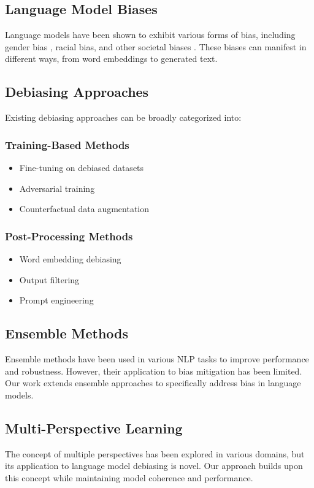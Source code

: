 \subsection{Language Model Biases}
Language models have been shown to exhibit various forms of bias, including gender bias \cite{bolukbasi2016man}, racial bias, and other societal biases \cite{caliskan2017semantics}. These biases can manifest in different ways, from word embeddings to generated text.

\subsection{Debiasing Approaches}
Existing debiasing approaches can be broadly categorized into:

\subsubsection{Training-Based Methods}
\begin{itemize}
    \item Fine-tuning on debiased datasets
    \item Adversarial training
    \item Counterfactual data augmentation
\end{itemize}

\subsubsection{Post-Processing Methods}
\begin{itemize}
    \item Word embedding debiasing
    \item Output filtering
    \item Prompt engineering
\end{itemize}

\subsection{Ensemble Methods}
Ensemble methods have been used in various NLP tasks to improve performance and robustness. However, their application to bias mitigation has been limited. Our work extends ensemble approaches to specifically address bias in language models.

\subsection{Multi-Perspective Learning}
The concept of multiple perspectives has been explored in various domains, but its application to language model debiasing is novel. Our approach builds upon this concept while maintaining model coherence and performance. 